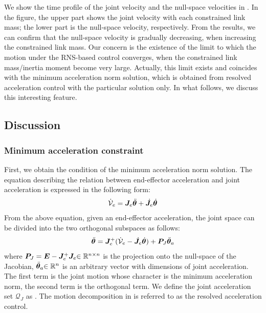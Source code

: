%
We show the time profile of the joint velocity and the null-space velocities in .
In the figure,
the upper part shows the joint velocity with each constrained link mass;
the lower part is the null-space velocity, respectively.
From the results,
we can confirm that the null-space velocity is gradually decreasing,
when increasing the constrained link mass.
Our concern is the existence of the limit to which the motion under the RNS-based control converges,
when the constrained link mass/inertia moment become very large.
Actually, this limit exists and coincides with the minimum acceleration norm solution,
which is obtained from resolved acceleration control \cite{Luh1980} with the particular solution only.
In what follows,
we discuss this interesting feature.

\subsection{Discussion}

\subsubsection{Minimum acceleration constraint}
First, we obtain the condition of the minimum acceleration norm solution.
The equation describing the relation between end-effector acceleration
and joint acceleration is expressed in the following form:
%
\begin{align}
  \dot{\mathcal{V}}_{e} = \bm{J}_{e}{\ddot{\bm{\theta}}} + \dot{\bm{J}}_{e}{\dot{\bm{\theta}}}
  \label{eq:ACC_EQ}
\end{align}
%
From the above equation,
given an end-effector acceleration,
the joint space can be divided into the two orthogonal subspaces as follows:
%
\begin{align}
  {\ddot{\bm{\theta}}} = \bm{J}_{e}^{+}(\dot{\mathcal{V}}_{e} - \dot{\bm{J}}_{e}{\dot{\bm{\theta}}}) + \bm{P}_{J}{\ddot{\bm{\theta}}}_{a}
  \label{eq:MINIMUM_ACC}
\end{align}
%
where $\bm{P}_{J} = \bm{E} - \bm{J}_{e}^{+}\bm{J}_{e}{\in\mathbb{R}^{n\times n}}$ is the projection
onto the null-space of the Jacobian,
${\ddot{\bm{\theta}}}_{a}{\in\mathbb{R}^{n}}$ is an arbitrary vector with dimensions of joint acceleration.
The first term is the joint motion whose character is the minimum acceleration norm,
the second term is the orthogonal term.
We define the joint acceleration set $\mathcal{Q}_{J}$ as .
The motion decomposition in 
is referred to as the resolved acceleration control.

